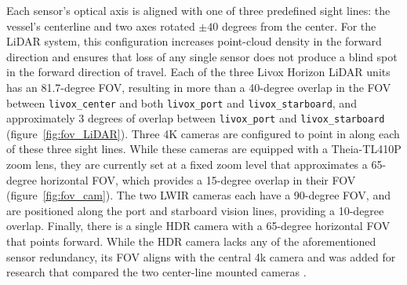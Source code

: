 \documentclass[../main.tex]{subfiles}
\begin{document}
Each sensor’s optical axis is aligned with one of three predefined sight lines: the vessel's centerline and two axes rotated $\pm 40$ degrees from the center.
For the LiDAR system, this configuration increases point-cloud density in the forward direction and ensures that loss of any single sensor does not produce a blind spot in the forward direction of travel.
Each of the three Livox Horizon LiDAR units has an 81.7-degree \ac{FOV}, resulting in more than a 40-degree overlap in the \ac{FOV} between \texttt{livox\_center} and both \texttt{livox\_port} and \texttt{livox\_starboard}, and approximately 3 degrees of overlap between \texttt{livox\_port} and \texttt{livox\_starboard} (figure~\ref{fig:fov_LiDAR}).
Three 4K cameras are configured to point in along each of these three sight lines. 
While these cameras are equipped with a Theia-TL410P zoom lens, they are currently set at a fixed zoom level that approximates a 65-degree horizontal \ac{FOV}, which provides a 15-degree overlap in their \ac{FOV} (figure~\ref{fig:fov_cam}).
The two \ac{LWIR} cameras each have a 90-degree \acs{FOV}, and are positioned along the port and starboard vision lines, providing a 10-degree overlap.
Finally, there is a single HDR camera with a 65-degree horizontal \ac{FOV} that points forward.
While the \ac{HDR} camera lacks any of the aforementioned sensor redundancy, its \ac{FOV} aligns with the central 4k camera and was added for research that compared the two center-line mounted cameras \cite{liebergall}.

\end{document}

